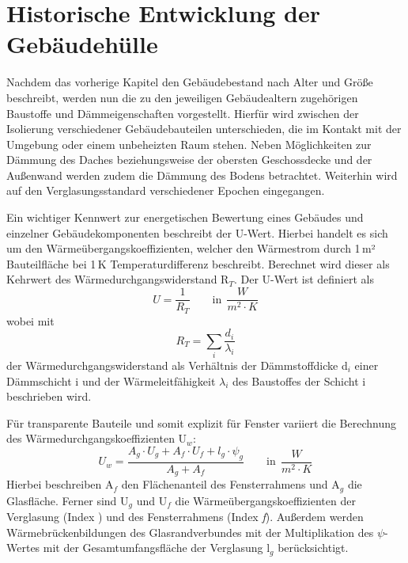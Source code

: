 \section{Historische Entwicklung der Gebäudehülle}
\label{sec:Sektion 22}

Nachdem das vorherige Kapitel den Gebäudebestand nach Alter und Größe beschreibt, werden nun die zu den jeweiligen Gebäudealtern zugehörigen Baustoffe und Dämmeigenschaften vorgestellt. 
Hierfür wird zwischen der Isolierung verschiedener Gebäudebauteilen unterschieden, die im Kontakt mit der Umgebung oder einem unbeheizten Raum stehen. 
Neben Möglichkeiten zur Dämmung des Daches beziehungsweise der obersten Geschossdecke und der Außenwand werden zudem die Dämmung des Bodens betrachtet.
Weiterhin wird auf den Verglasungsstandard verschiedener Epochen eingegangen.

Ein wichtiger Kennwert zur energetischen Bewertung eines Gebäudes und einzelner Gebäudekomponenten beschreibt der U-Wert.
Hierbei handelt es sich um den Wärmeübergangskoeffizienten, welcher den Wärmestrom durch 1\,m² Bauteilfläche bei 1\,K Temperaturdifferenz beschreibt. 
Berechnet wird dieser als Kehrwert des Wärmedurchgangswiderstand R\(_T\). 
Der U-Wert ist definiert als
\begin{equation}
\label{eq:Gleichung221}
U = \frac{1}{R_T}  \qquad \text{in} \ \ \frac{W}{m^2 \cdot K} 
\end{equation}
wobei mit
\begin{equation}
\label{eq:Gleichung222}
R_T = \sum \limits_{i} \frac{d_i}{\lambda_i}	
\end{equation}				%
der Wärmedurchgangswiderstand als Verhältnis der Dämmstoffdicke d\(_i\) einer Dämmschicht i und der Wärmeleitfähigkeit \(\lambda_i\) des Baustoffes der Schicht i beschrieben wird. 

Für transparente Bauteile und somit explizit für Fenster variiert die Berechnung des Wärmedurchgangskoeffizienten U\(_w\):
\begin{equation}
\label{eq:Gleichung223}
U_w = \frac{A_g \cdot U_g + A_f \cdot U_f + l_g \cdot \psi_g}{A_g + A_f}  \qquad \text{in} \ \ \frac{W}{m^2 \cdot K}
\end{equation}
Hierbei beschreiben A\(_f\) den Flächenanteil des Fensterrahmens und A\(_g\) die Glasfläche. 
Ferner sind U\(_g\) und U\(_f\) die Wärmeübergangskoeffizienten der Verglasung (Index ) und des Fensterrahmens (Index \textit{f}). 
Außerdem werden Wärmebrückenbildungen des Glasrandverbundes mit der Multiplikation des \(\psi\)-Wertes mit der Gesamtumfangsfläche der Verglasung l\(_g\) berücksichtigt. \cite{Laasch.2013}


